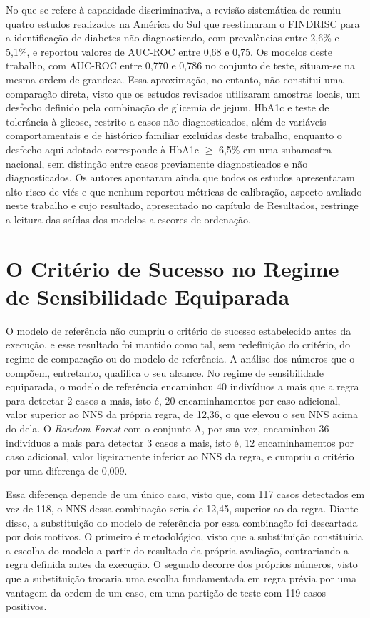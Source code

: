 No que se refere à capacidade discriminativa, a revisão sistemática de \textcite{CarrilloLarco2020} reuniu quatro estudos realizados na América do Sul que reestimaram o FINDRISC para a identificação de diabetes não diagnosticado, com prevalências entre 2,6\% e 5,1\%, e reportou valores de AUC-ROC entre 0,68 e 0,75. Os modelos deste trabalho, com AUC-ROC entre 0,770 e 0,786 no conjunto de teste, situam-se na mesma ordem de grandeza. Essa aproximação, no entanto, não constitui uma comparação direta, visto que os estudos revisados utilizaram amostras locais, um desfecho definido pela combinação de glicemia de jejum, HbA1c e teste de tolerância à glicose, restrito a casos não diagnosticados, além de variáveis comportamentais e de histórico familiar excluídas deste trabalho, enquanto o desfecho aqui adotado corresponde à HbA1c $\geq$ 6,5\% em uma subamostra nacional, sem distinção entre casos previamente diagnosticados e não diagnosticados. Os autores apontaram ainda que todos os estudos apresentaram alto risco de viés e que nenhum reportou métricas de calibração, aspecto avaliado neste trabalho e cujo resultado, apresentado no capítulo de Resultados, restringe a leitura das saídas dos modelos a escores de ordenação.

\section{O Critério de Sucesso no Regime de Sensibilidade Equiparada}\label{sec:disc-criterio}
O modelo de referência não cumpriu o critério de sucesso estabelecido antes da execução, e esse resultado foi mantido como tal, sem redefinição do critério, do regime de comparação ou do modelo de referência. A análise dos números que o compõem, entretanto, qualifica o seu alcance. No regime de sensibilidade equiparada, o modelo de referência encaminhou 40 indivíduos a mais que a regra para detectar 2 casos a mais, isto é, 20 encaminhamentos por caso adicional, valor superior ao NNS da própria regra, de 12,36, o que elevou o seu NNS acima do dela. O \textit{Random Forest} com o conjunto A, por sua vez, encaminhou 36 indivíduos a mais para detectar 3 casos a mais, isto é, 12 encaminhamentos por caso adicional, valor ligeiramente inferior ao NNS da regra, e cumpriu o critério por uma diferença de 0,009.

Essa diferença depende de um único caso, visto que, com 117 casos detectados em vez de 118, o NNS dessa combinação seria de 12,45, superior ao da regra. Diante disso, a substituição do modelo de referência por essa combinação foi descartada por dois motivos. O primeiro é metodológico, visto que a substituição constituiria a escolha do modelo a partir do resultado da própria avaliação, contrariando a regra definida antes da execução. O segundo decorre dos próprios números, visto que a substituição trocaria uma escolha fundamentada em regra prévia por uma vantagem da ordem de um caso, em uma partição de teste com 119 casos positivos.

